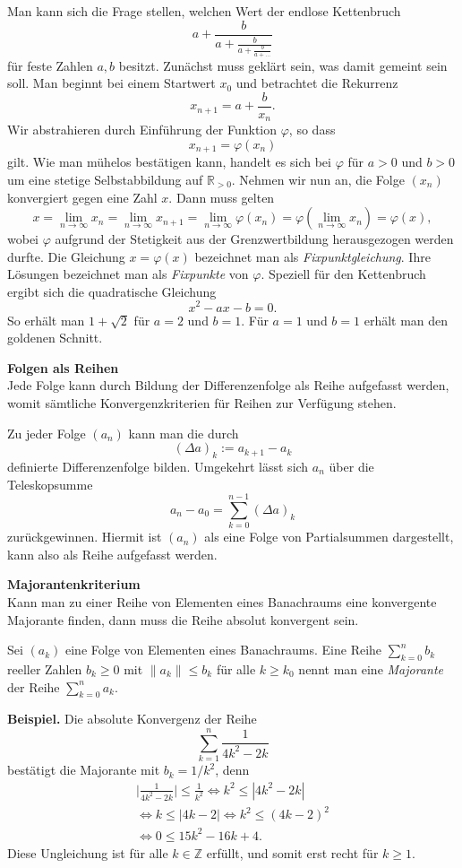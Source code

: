 \documentclass[paper=180mm:225mm,pagesize=auto,fleqn,twoside,11pt,dvipdfmx]{scrartcl}
\theoremstyle{rmbox}
\newenvironment{Rezept}[1]{\strong{#1}\\}{}
\newcommand{\strong}[1]{\textsf{\textbf{#1}}}
\newcommand{\Z}{\mathbb Z}
\newcommand{\R}{\mathbb R}
\begin{document}
\noindent
Man kann sich die Frage stellen, welchen Wert der endlose
Kettenbruch
\[a+\frac{b}{a+\frac{b}{a+\frac{b}{a+\ldots}}}\]
für feste Zahlen $a,b$ besitzt. Zunächst muss geklärt sein, was
damit gemeint sein soll. Man beginnt bei einem Startwert $x_0$
und betrachtet die Rekurrenz
\[x_{n+1} = a+\frac{b}{x_n}.\]
Wir abstrahieren durch Einführung der Funktion $\varphi$, so dass
\[x_{n+1} = \varphi(x_n)\]
gilt. Wie man mühelos bestätigen kann, handelt es sich bei $\varphi$
für $a>0$ und $b>0$ um eine stetige Selbstabbildung auf $\R_{>0}$.
Nehmen wir nun an, die Folge $(x_n)$ konvergiert gegen eine Zahl $x$.
Dann muss gelten
\[x = \lim_{n\to\infty} x_{n} = \lim_{n\to\infty} x_{n+1}
= \lim_{n\to\infty}\varphi(x_n)
= \varphi(\lim_{n\to\infty} x_n) = \varphi(x),\]
wobei $\varphi$ aufgrund der Stetigkeit aus der Grenzwertbildung
herausgezogen werden durfte. Die Gleichung $x = \varphi(x)$
bezeichnet man als \emph{Fixpunktgleichung}. Ihre Lösungen
bezeichnet man als \emph{Fixpunkte} von $\varphi$. Speziell für den
Kettenbruch ergibt sich die quadratische Gleichung
\[x^2 - ax - b = 0.\]
So erhält man $1+\sqrt{2}$ für $a=2$ und $b=1$.
Für $a=1$ und $b=1$ erhält man den goldenen Schnitt.

\begin{Rezept}{Folgen als Reihen}
Jede Folge kann durch Bildung der Differenzenfolge als Reihe
aufgefasst werden, womit sämtliche Konvergenzkriterien für Reihen
zur Verfügung stehen.
\end{Rezept}

\noindent
Zu jeder Folge $(a_n)$ kann man die durch
\[(\Delta a)_k := a_{k+1} - a_k\]
definierte Differenzenfolge bilden. Umgekehrt lässt sich $a_n$ über
die Teleskopsumme
\[a_n-a_0 = \sum_{k=0}^{n-1} (\Delta a)_k\]
zurückgewinnen. Hiermit ist $(a_n)$ als eine Folge von
Partialsummen dargestellt, kann also als Reihe aufgefasst werden.

\begin{Rezept}{Majorantenkriterium}
Kann man zu einer Reihe von Elementen eines Banachraums eine
konvergente Majorante finden, dann muss die Reihe absolut konvergent
sein. 
\end{Rezept}

\noindent
Sei $(a_k)$ eine Folge von Elementen eines Banachraums.
Eine Reihe $\sum_{k=0}^n b_k$ reeller Zahlen $b_k\ge 0$ mit
$\|a_k\|\le b_k$ für alle $k\ge k_0$ nennt man eine \emph{Majorante}
der Reihe $\sum_{k=0}^n a_k$.

\strong{Beispiel.} Die absolute Konvergenz der Reihe
\[\sum_{k=1}^n\frac{1}{4k^2-2k}\]
bestätigt die Majorante mit $b_k=1/k^2$, denn
\begin{gather*}
\Big|\frac{1}{4k^2-2k}\Big| \le \frac{1}{k^2}\iff k^2\le |4k^2-2k|\\
\iff k\le |4k-2| \iff k^2 \le (4k-2)^2\\
\iff 0\le 15k^2-16k+4.
\end{gather*}
Diese Ungleichung ist für alle $k\in\Z$ erfüllt, und somit erst recht
für $k\ge 1$.
\end{document}
